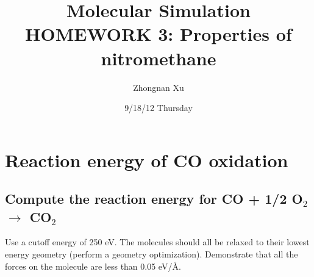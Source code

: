 \documentclass[11pt]{article}
\title{Molecular Simulation HOMEWORK 3: Properties of nitromethane}
\author{Zhongnan Xu}
\date{9/18/12 Thursday}
\begin{document}
\maketitle

\setcounter{tocdepth}{3}
\tableofcontents
\vspace*{1cm}


\section{Reaction energy of CO oxidation}
\label{sec-1}
\subsection{Compute the reaction energy for CO + 1/2 O$_{2}$ $\rightarrow$ CO$_{2}$}
\label{sec-1-1}
\label{rxn-energy}

Use a cutoff energy of 250 eV. The molecules should all be relaxed to their lowest energy geometry (perform a geometry optimization). Demonstrate that all the forces on the molecule are less than 0.05 eV/\AA{}.
\end{document}
